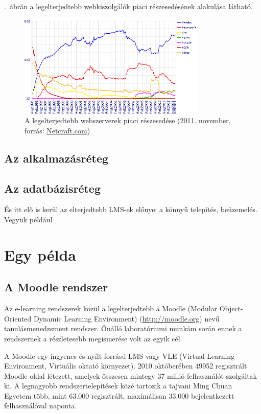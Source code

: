.~ábrán a legelterjedtebb webkiszolgálók piaci részesedésének alakulása látható.

\begin{figure}[h!]
\centering
\includegraphics[width=0.8\textwidth]{figures/wpid-overallc.png}
\caption{A legelterjedtebb webszerverek piaci részesedése (2011. november, forrás: \href{http://news.netcraft.com/archives/2011/11/07/november-2011-web-server-survey.html}{Netcraft.com}) \label{fig:netcraft_webservers}}
\end{figure} 

\subsection{Az alkalmazásréteg}
\subsection{Az adatbázisréteg}

És itt elő is kerül az elterjedtebb LMS-ek előnye: a könnyű telepítés, beüzemelés. Vegyük például

\section{Egy példa}
\subsection{A Moodle rendszer}
Az e-learning rendszerek közül a legelterjedtebb a Moodle (Modular Object-Oriented Dynamic Learning Environment) (\href{http://moodle.org}{http://moodle.org}) nevű tanulásmenedzsment rendszer. Önálló laboratóriumi munkám során ennek a rendszernek a részletesebb megismerése volt az egyik cél.

A Moodle  egy ingyenes és nyílt forrású LMS vagy VLE (Virtual Learning Environment, Virtuális oktató környezet). 2010 októberében 49952 regisztrált Moodle oldal létezett, amelyek összesen mintegy 37 millió felhasználót szolgáltak ki. A legnagyobb rendszertelepítések közé tartozik a tajvani Ming Chuan Egyetem több, mint 63.000 regisztrált, maximálisan 33.000 bejelentkezett felhasználóval naponta.

